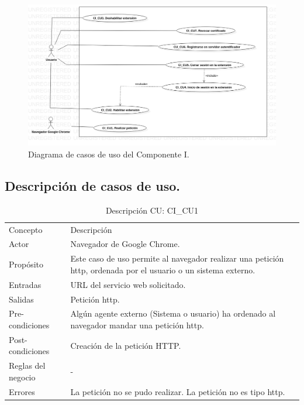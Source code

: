 \documentclass[12pt, a4paper, titlepage]{report}
\begin{document}
			    \begin{figure}[H]
		            \begin{center}			                \includegraphics[width=16cm]{./imagenes/Disenio/Componente_1/CI_UCD.png}
						\caption{Diagrama de casos de uso del Componente I.}
                    \end{center}    					
				\end{figure}
			    
	        \subsection{Descripción de casos de uso.}
			    
			    \begin{table}[H]
				\begin{tabular}{ |p{3.5cm}||p{9.5cm}|}
					\hline
					\rowcolor{guindapoli}
					\multicolumn{2}{|c|}{\textbf{\textcolor{white}{Caso de uso: CI\_CU1. Realizar petición.}}}\\
					\hline
					\rowcolor{azulfuerte}Concepto & Descripción\\
					\hline
					\cellcolor{azulclaro}Actor & 
					Navegador de Google Chrome.\\ 
					\hline
					\cellcolor{azulclaro}Propósito &
					Este caso de uso permite al navegador realizar una petición \acrshort{http}, ordenada por el usuario o un sistema externo.\\
					\hline
					\cellcolor{azulclaro}Entradas &
					URL del servicio web solicitado.\\
					\hline
					\cellcolor{azulclaro}Salidas &
					Petición \acrshort{http}.\\
					\hline
					\cellcolor{azulclaro}Pre-condiciones&
					Algún agente externo (Sistema o usuario) ha ordenado al navegador mandar una petición \acrshort{http}.\\
					\hline
					\cellcolor{azulclaro}Post-condiciones&
					Creación de la petición HTTP.\\
					\hline
					\cellcolor{azulclaro}Reglas del negocio&
					-\\
					\hline
					\cellcolor{azulclaro}Errores &
					La petición no se pudo realizar. \newline La petición no es tipo \acrshort{http}.\\					
					\hline
				\end{tabular}
				\caption[DCU: CI\_CU1]{Descripción CU: CI\_CU1}
				\end{table}
				
\end{document}
